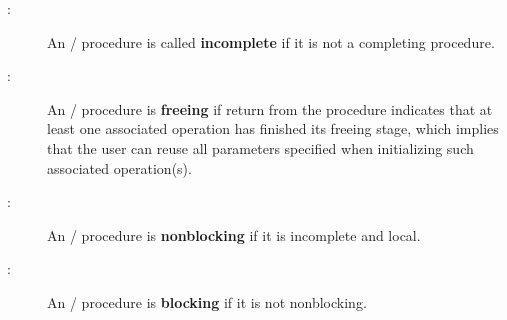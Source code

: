 \begin{description}
\item[:]
An \MPI/ procedure is called \textbf{incomplete} if it
is not a completing procedure.

\item[:]
An \MPI/ procedure is \textbf{freeing} if return from the procedure
indicates that at least one associated operation has finished its freeing
stage, which implies that the user can reuse all parameters specified
when initializing such associated operation(s).
\end{description}

\begin{description}
\item[:]
An \MPI/ procedure is \textbf{nonblocking} if it is incomplete and
local.

\item[:]
An \MPI/ procedure is \textbf{blocking} if it is not nonblocking.
\end{description}

